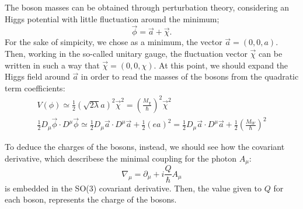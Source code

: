 \documentclass[main.tex]{subfiles}
\begin{document}
The boson masses can be obtained through perturbation theory, considering an Higgs potential with little fluctuation around the minimum;
\begin{equation}
\vec{\phi} = \vec{a}+ \vec{\chi}.
\end{equation}
For the sake of simpicity, we chose as a minimum, the vector $\vec{a}= (0,0,a)$. Then, working in the so-called unitary gauge, the fluctuation vector $\vec{\chi}$ can be written in such a way that $\vec{\chi} = (0,0,\chi) $.
At this point, we should expand the Higgs field around $\vec{a}$ in order to read the masses of the bosons from the quadratic term coefficients:
\begin{gather}
V(\phi)\simeq  \frac{1}{2}  \left(\sqrt{2 \lambda} a\right)^2 \vec{\chi}^2 = \left( \frac{M_\chi}{\hbar }\right)^2 \vec{\chi}^2 \\
 \frac{1}{2}D_{\mu}\vec{\phi} \cdot  D^\mu \vec{\phi} \simeq  \frac{1}{2}D_{\mu}\vec{a} \cdot  D^\mu \vec{a}  + \frac{1}{2} \left( ea \right)^2 =\frac{1}{2}D_{\mu}\vec{a} \cdot  D^\mu \vec{a}  + \frac{1}{2} \left( \frac{M_W}{\hbar} \right)^2
\end{gather}

To deduce the charges of the bosons, instead, we should see how the covariant derivative, which describese the minimal coupling for the photon $A_{\mu}$:
\begin{equation}
\nabla_\mu = \partial_\mu + i \frac{Q}{\hbar} A_{\mu}
\end{equation}
is embedded in the SO(3) covariant derivative. Then, the value given to $Q$ for each boson, represents the charge of the bosons.
\end{document}
